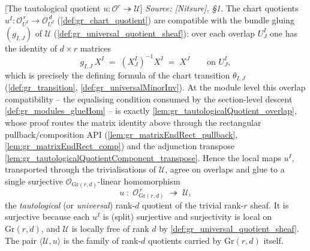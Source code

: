 \begin{definition}

[The tautological quotient \(u : \mathcal{O}^{r} \twoheadrightarrow \mathcal{U}\)]
  \label{def:tautological_quotient}
  \textit{Source: [Nitsure], \S 1.}
  The chart quotients \(u^I : \mathcal{O}_{U^I}^{\,r} \to \mathcal{O}_{U^I}^{\,d}\)
  (\cref{def:gr_chart_quotient}) are compatible with the bundle gluing
  \((g_{I,J})\) of \(\mathcal{U}\) (\cref{def:gr_universal_quotient_sheaf}): over
  each overlap \(U^I_J\) one has the identity of \(d \times r\) matrices
  \[
    g_{I,J}\, X^I \;=\; (X^I_J)^{-1} X^I \;=\; X^J \qquad \text{on } U^I_J,
  \]
  which is precisely the defining formula of the chart transition
  \(\theta_{I,J}\) (\cref{def:gr_transition}, \cref{def:gr_universalMinorInv}). At the
  module level this overlap compatibility -- the equalising condition consumed by the
  section-level descent \cref{def:gr_modules_glueHom} -- is exactly
  \cref{lem:gr_tautologicalQuotient_overlap}, whose proof routes the matrix identity above
  through the rectangular pullback/composition API
  (\cref{lem:gr_matrixEndRect_pullback}, \cref{lem:gr_matrixEndRect_comp}) and the
  adjunction transpose \cref{lem:gr_tautologicalQuotientComponent_transpose}.
  Hence the local maps \(u^I\), transported through the trivialisations of
  \(\mathcal{U}\), agree on overlaps and glue to a single surjective
  \(\mathcal{O}_{\mathrm{Gr}(r,d)}\)-linear homomorphism
  \[
    u \;:\; \mathcal{O}_{\mathrm{Gr}(r,d)}^{\,r}
      \;\twoheadrightarrow\; \mathcal{U},
  \]
  the \emph{tautological} (or \emph{universal}) rank-\(d\) quotient of the trivial
  rank-\(r\) sheaf. It is surjective because each \(u^I\) is (split) surjective and
  surjectivity is local on \(\mathrm{Gr}(r,d)\), and \(\mathcal{U}\) is locally
  free of rank \(d\) by \cref{def:gr_universal_quotient_sheaf}. The pair
  \(\langle \mathcal{U}, u \rangle\) is the family of rank-\(d\) quotients carried
  by \(\mathrm{Gr}(r,d)\) itself.
\end{definition}

